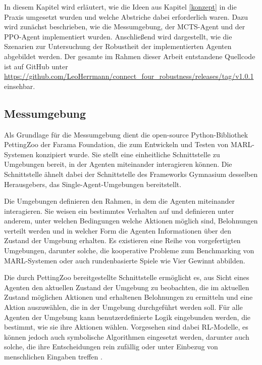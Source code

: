 In diesem Kapitel wird erläutert, wie die Ideen aus Kapitel \ref{konzept} in die Praxis umgesetzt wurden und welche Abstriche dabei erforderlich waren. Dazu wird zunächst beschrieben, wie die Messumgebung, der MCTS-Agent und der PPO-Agent implementiert wurden. Anschließend wird dargestellt, wie die Szenarien zur Untersuchung der Robustheit der implementierten Agenten abgebildet werden. Der gesamte im Rahmen dieser Arbeit entstandene Quellcode ist auf GitHub unter \url{https://github.com/LeoHerrmann/connect_four_robustness/releases/tag/v1.0.1} einsehbar.

\subsection{Messumgebung}

\label{messumgebung}


Als Grundlage für die Messumgebung dient die open-source Python-Bibliothek PettingZoo der Farama Foundation, die zum Entwickeln und Testen von MARL-Systemen konzipiert wurde. Sie stellt eine einheitliche Schnittstelle zu Umgebungen bereit, in der Agenten miteinander interagieren können. Die Schnittstelle ähnelt dabei der Schnittstelle des Frameworks Gymnasium desselben Herausgebers, das Single-Agent-Umgebungen bereitstellt.

Die Umgebungen definieren den Rahmen, in dem die Agenten miteinander interagieren. Sie weisen ein bestimmtes Verhalten auf und definieren unter anderem, unter welchen Bedingungen welche Aktionen möglich sind, Belohnungen verteilt werden und in welcher Form die Agenten Informationen über den Zustand der Umgebung erhalten. Es existieren eine Reihe von vorgefertigten Umgebungen, darunter solche, die kooperative Probleme zum Benchmarking von MARL-Systemen oder auch rundenbasierte Spiele wie Vier Gewinnt abbilden.

Die durch PettingZoo bereitgestellte Schnittstelle ermöglicht es, aus Sicht eines Agenten den aktuellen Zustand der Umgebung zu beobachten, die im aktuellen Zustand möglichen Aktionen und erhaltenen Belohnungen zu ermitteln und eine Aktion auszuwählen, die in der Umgebung durchgeführt werden soll. Für alle Agenten der Umgebung kann benutzerdefinierte Logik eingebunden werden, die bestimmt, wie sie ihre Aktionen wählen. Vorgesehen sind dabei RL-Modelle, es können jedoch auch symbolische Algorithmen eingesetzt werden, darunter auch solche, die ihre Entscheidungen rein zufällig oder unter Einbezug von menschlichen Eingaben treffen \cite{Farama.2025}.

